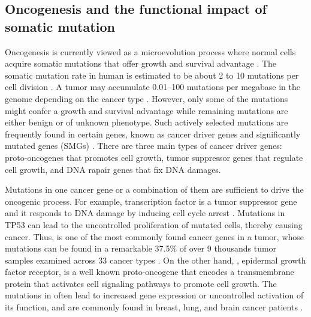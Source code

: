 \subsection{Oncogenesis and the functional impact of somatic mutation}
Oncogenesis is currently viewed as a microevolution process where normal cells acquire somatic mutations that offer growth and survival advantage \cite{strattonmr_futrealpa:CancerGenome2009,martincorenai_campbellpj:SomaticMutation2015}. The somatic mutation rate in human is estimated to be about 2 to 10 mutations per cell division \cite{lynchm_lynchm:RateMolecular2010,milhollandb_vijgj:DifferencesGermline2017}. A tumor may accumulate 0.01--100 mutations per megabase in the genome depending on the cancer type \cite{lawrencems_getzg:MutationalHeterogeneity2013,martincorenai_campbellpj:SomaticMutation2015}. However, only some of the mutations might confer a growth and survival advantage while remaining mutations are either benign or of unknown phenotype. Such actively selected mutations are frequently found in certain genes, known as cancer driver genes and significantly mutated genes (SMGs) \cite{dingl_mariamidzea:PerspectiveOncogenic2018}. There are three main types of cancer driver genes: proto-oncogenes that promotes cell growth, tumor suppressor genes that regulate cell growth, and DNA rapair genes that fix DNA damages.

Mutations in one cancer gene or a combination of them are sufficient to drive the oncogenic process. For example, transcription factor  is a tumor suppressor gene\footnotemark{} and it responds to DNA damage by inducing cell cycle arrest \cite{kastanmb_craigrw:ParticipationP531991}. Mutations in TP53 can lead to the uncontrolled proliferation of mutated cells, thereby causing cancer. Thus,  is one of the most commonly found cancer genes in a tumor, whose mutations can be found in a remarkable 37.5\% of over 9 thousands tumor samples examined across 33 cancer types \cite{baileymh_dingl:ComprehensiveCharacterization2018}. On the other hand, , epidermal growth factor receptor, is a well known proto-oncogene that encodes a transmembrane protein that activates cell signaling pathways to promote cell growth. The mutations in  often lead to increased gene expression or uncontrolled activation of its function, and are commonly found in breast, lung, and brain cancer patients \cite{ciardiellof_tortorag:EGFRAntagonists2008}.


